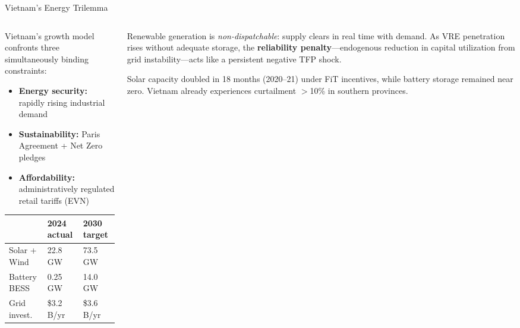 \documentclass[aspectratio=169,10pt]{beamer}
\newcommand{\fuvhl}[1]{\textcolor{fuvteal}{\textbf{#1}}}
\begin{document}
\begin{frame}{Vietnam's Energy Trilemma}
  \begin{columns}[T]
    \begin{column}{0.47\textwidth}
      Vietnam's growth model confronts three simultaneously binding constraints:
      \medskip
      \begin{itemize}
        \item \fuvhl{Energy security:} rapidly rising industrial demand
        \item \fuvhl{Sustainability:} Paris Agreement + Net Zero pledges
        \item \fuvhl{Affordability:} administratively regulated retail tariffs (EVN)
      \end{itemize}
      \medskip
      \begin{keybox}[title=PDP8 at a Glance]
        \small
        \begin{tabular}{@{}lll@{}}
          & \textbf{2024 actual} & \textbf{2030 target}\\
          \midrule
          Solar + Wind & 22.8 GW & 73.5 GW\\
          Battery BESS & 0.25 GW & 14.0 GW\\
          Grid invest.\ & \$3.2 B/yr & \$3.6 B/yr\\
        \end{tabular}
      \end{keybox}
    \end{column}
    \begin{column}{0.50\textwidth}
      \begin{alertbox}[title=The Core Structural Friction]
        \small Renewable generation is \textit{non-dispatchable}: supply clears in real time with demand. As VRE penetration rises without adequate storage, the \textbf{reliability penalty}---endogenous reduction in capital utilization from grid instability---acts like a persistent negative TFP shock.
      \end{alertbox}
      \vspace{0.3em}
      \begin{goldbox}[title=Empirical Trigger]
        \small Solar capacity doubled in 18 months (2020–21) under FiT incentives, while battery storage remained near zero. Vietnam already experiences curtailment $>$10\% in southern provinces.
      \end{goldbox}
    \end{column}
  \end{columns}
\end{frame}
\end{document}
